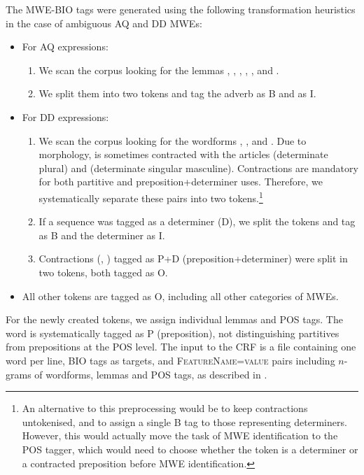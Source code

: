 \documentclass[output=paper,modfonts]{langscibook}
\begin{document}
The MWE-BIO tags were generated using the following transformation heuristics in the case of ambiguous AQ and DD MWEs: 
\begin{itemize}
  \item For AQ expressions:
  \begin{enumerate}
  \item We scan the corpus looking for the lemmas , , , , ,  and .%
  \item We split them into two tokens and tag the adverb as {\textsc B} and  as {\textsc I}.
  \end{enumerate}
  \item For DD expressions:
  \begin{enumerate}
  \item We scan the corpus looking for the wordforms , ,  and . Due to  morphology,  is sometimes contracted with the articles  (determinate plural) and  (determinate singular masculine). Contractions are mandatory for both partitive and preposition+determiner uses. Therefore, we systematically separate these pairs into two tokens.\footnote{An alternative to this preprocessing would be to keep contractions untokenised, and to assign a single \textsc{B} tag to those representing determiners. However, this would actually move the task of MWE identification to the POS tagger, which would need to choose whether the token is a determiner or a contracted preposition before MWE identification.}
  \item If a sequence was tagged as a determiner ({\textsc D}), we split the tokens and tag  as {\textsc B} and the determiner as {\textsc I}. 
  \item Contractions (, ) tagged as {\textsc P+D} (preposition+determiner) were split in two tokens, both tagged as {\textsc O}.
  \end{enumerate}
  \item All other tokens are tagged as {\textsc O}, including all other categories of MWEs.
\end{itemize}

For the newly created tokens, we assign individual lemmas and POS tags. The word  is systematically tagged as \textsc{P} (preposition), not distinguishing partitives from prepositions at the POS level. The input to the CRF is a file containing one word per line, BIO tags as targets, and \textsc{FeatureName=value} pairs including $n$-grams of wordforms, lemmas and POS tags, as described in . %
\end{document}
